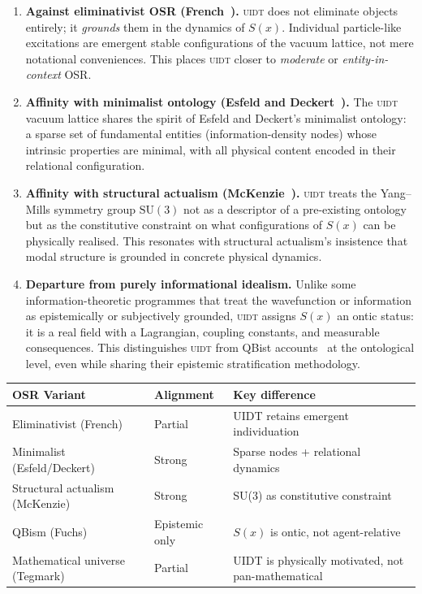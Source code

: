 \begin{enumerate}[leftmargin=1.8em,itemsep=4pt]
  \item \textbf{Against eliminativist OSR (French~\cite{French2014}).}
        \textsc{uidt} does not eliminate objects entirely; it
        \emph{grounds} them in the dynamics of $S(x)$. Individual
        particle-like excitations are emergent stable configurations of
        the vacuum lattice, not mere notational conveniences.
        This places \textsc{uidt} closer to \emph{moderate} or
        \emph{entity-in-context} OSR.
  \item \textbf{Affinity with minimalist ontology (Esfeld and
        Deckert~\cite{Esfeld2017}).}
        The \textsc{uidt} vacuum lattice shares the spirit of Esfeld and
        Deckert's minimalist ontology: a sparse set of fundamental entities
        (information-density nodes) whose intrinsic properties are minimal,
        with all physical content encoded in their relational configuration.
  \item \textbf{Affinity with structural actualism
        (McKenzie~\cite{McKenzie2017}).}
        \textsc{uidt} treats the Yang--Mills symmetry group $\mathrm{SU}(3)$
        not as a descriptor of a pre-existing ontology but as the
        constitutive constraint on what configurations of $S(x)$ can be
        physically realised. This resonates with structural actualism's
        insistence that modal structure is grounded in concrete physical
        dynamics.
  \item \textbf{Departure from purely informational idealism.}
        Unlike some information-theoretic programmes that treat the wavefunction
        or information as epistemically or subjectively grounded, \textsc{uidt}
        assigns $S(x)$ an ontic status: it is a real field with a Lagrangian,
        coupling constants, and measurable consequences. This distinguishes
        \textsc{uidt} from QBist accounts~\cite{Fuchs2014} at the ontological
        level, even while sharing their epistemic stratification methodology.
\end{enumerate}

\begin{tcolorbox}[pillarbox,
  title={\small Positioning Summary: \textsc{uidt} and OSR Variants},
]
{\small
\begin{tabular}{@{}p{4.2cm}p{3.0cm}p{5.2cm}@{}}
  \toprule
  \textbf{OSR Variant} & \textbf{Alignment} & \textbf{Key difference} \\
  \midrule
  Eliminativist (French) & Partial & UIDT retains emergent individuation \\
  Minimalist (Esfeld/Deckert) & Strong & Sparse nodes + relational dynamics \\
  Structural actualism (McKenzie) & Strong & SU(3) as constitutive constraint \\
  QBism (Fuchs) & Epistemic only & $S(x)$ is ontic, not agent-relative \\
  Mathematical universe (Tegmark) & Partial & UIDT is physically motivated, not pan-mathematical \\
  \bottomrule
\end{tabular}
}
\end{tcolorbox}

